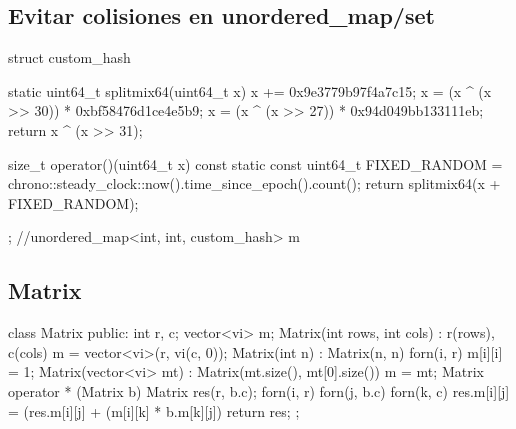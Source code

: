 \documentclass[10pt, landscape, twocolumn, a4paper, notitlepage]{article}
\begin{document}
\subsection{Evitar colisiones en unordered\_map/set}
\begin{code}
struct custom_hash {
    static uint64_t splitmix64(uint64_t x) {
        x += 0x9e3779b97f4a7c15;
        x = (x ^ (x >> 30)) * 0xbf58476d1ce4e5b9;
        x = (x ^ (x >> 27)) * 0x94d049bb133111eb;
        return x ^ (x >> 31);
    }
 
    size_t operator()(uint64_t x) const {
        static const uint64_t FIXED_RANDOM = chrono::steady_clock::now().time_since_epoch().count();
        return splitmix64(x + FIXED_RANDOM);
    }
};
//unordered_map<int, int, custom_hash> m
\end{code}
\subsection{Matrix}
\begin{code}
class Matrix{
public:
    int r, c;
    vector<vi> m;
    Matrix(int rows, int cols) : r(rows), c(cols){
        m = vector<vi>(r, vi(c, 0));
    }
    Matrix(int n) : Matrix(n, n){
        forn(i, r) m[i][i] = 1; 
    }
    Matrix(vector<vi> mt) : Matrix(mt.size(), mt[0].size()) {
        m = mt;
    }
    Matrix operator * (Matrix b) {
        Matrix res(r, b.c);
        forn(i, r) {
            forn(j, b.c) {
                forn(k, c) {
                    res.m[i][j] = (res.m[i][j] + (m[i][k] * b.m[k][j])%
                }
            }
        }
        return res;
    }
};
\end{code}
\newpage
\end{document}
